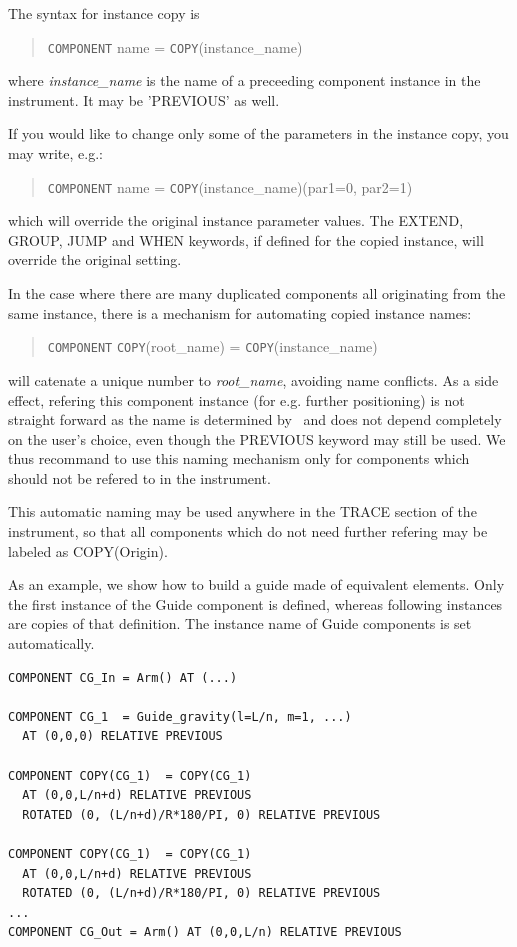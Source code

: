 The syntax for instance copy is
\begin{quote}
  \texttt{COMPONENT} name = \texttt{COPY}(instance\_name)
\end{quote}
where {\it instance\_name} is the name of a preceeding component instance in the instrument. It may be 'PREVIOUS' as well.

If you would like to change only some of the parameters in the instance copy, you may write, e.g.:
\begin{quote}
  \texttt{COMPONENT} name = \texttt{COPY}(instance\_name)(par1=0, par2=1)
\end{quote}
which will override the original instance parameter values. The EXTEND, GROUP, JUMP and WHEN keywords, if defined for the copied instance, will override the original setting.

In the case where there are many duplicated components all originating from the same instance, there is a mechanism for automating copied instance names:
\begin{quote}
  \texttt{COMPONENT} \texttt{COPY}(root\_name) = \texttt{COPY}(instance\_name)
\end{quote}
will catenate a unique number to {\it root\_name}, avoiding name
conflicts. As a side effect, refering this component instance (for
e.g. further positioning) is not straight forward as the name is
determined by \MCS\ and does not depend completely on the user's
choice, even though the PREVIOUS keyword may still be used. We thus recommand to use this naming mechanism only for components which should not be refered to in the instrument.

This automatic naming may be used anywhere in the TRACE section of the instrument, so that all components which do not need further refering may be labeled as COPY(Origin).

As an example, we show how to build a guide made of equivalent elements. Only the first instance of the Guide component is defined, whereas following instances are copies of that definition. The instance name of Guide components is set automatically.

\begin{verbatim}
COMPONENT CG_In = Arm() AT (...)

COMPONENT CG_1  = Guide_gravity(l=L/n, m=1, ...)
  AT (0,0,0) RELATIVE PREVIOUS

COMPONENT COPY(CG_1)  = COPY(CG_1)
  AT (0,0,L/n+d) RELATIVE PREVIOUS
  ROTATED (0, (L/n+d)/R*180/PI, 0) RELATIVE PREVIOUS

COMPONENT COPY(CG_1)  = COPY(CG_1)
  AT (0,0,L/n+d) RELATIVE PREVIOUS
  ROTATED (0, (L/n+d)/R*180/PI, 0) RELATIVE PREVIOUS
...
COMPONENT CG_Out = Arm() AT (0,0,L/n) RELATIVE PREVIOUS
\end{verbatim}

